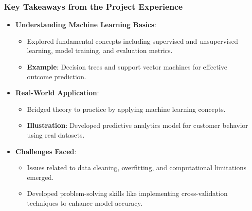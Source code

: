 \documentclass[aspectratio=169]{beamer}
\begin{document}
\begin{frame}[fragile]
    \frametitle{Key Takeaways from the Project Experience}
    \begin{itemize}
        \item \textbf{Understanding Machine Learning Basics}:
        \begin{itemize}
            \item Explored fundamental concepts including supervised and unsupervised learning, model training, and evaluation metrics.
            \item \textbf{Example}: Decision trees and support vector machines for effective outcome prediction.
        \end{itemize}
        
        \item \textbf{Real-World Application}:
        \begin{itemize}
            \item Bridged theory to practice by applying machine learning concepts.
            \item \textbf{Illustration}: Developed predictive analytics model for customer behavior using real datasets.
        \end{itemize}
        
        \item \textbf{Challenges Faced}:
        \begin{itemize}
            \item Issues related to data cleaning, overfitting, and computational limitations emerged.
            \item Developed problem-solving skills like implementing cross-validation techniques to enhance model accuracy.
        \end{itemize}
    \end{itemize}
\end{frame}
\end{document}
